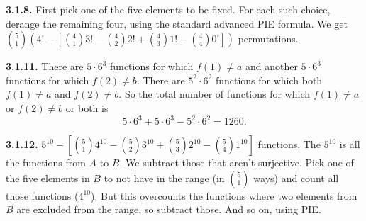 \documentclass[10pt,]{book}
\theoremstyle{plain}
\theoremstyle{definition}
\theoremstyle{definition}
\theoremstyle{definition}
\numberwithin{equation}{chapter}
\begin{document}
\noindent\textbf{3.1.8.} \hypertarget{p-1169}{}%
First pick one of the five elements to be fixed.  For each such choice, derange the remaining four, using the standard advanced PIE formula.  We get \({5 \choose 1}\left( 4! - \left[{4 \choose 1}3! - {4 \choose 2}2! + {4 \choose 3} 1! - {4 \choose 4} 0!\right] \right)\) permutations.%
\par\smallskip
\noindent\textbf{3.1.11.} \hypertarget{p-1176}{}%
There are \(5 \cdot 6^3\) functions for which \(f(1) \ne a\) and another \(5 \cdot 6^3\) functions for which \(f(2) \ne b\).  There are \(5^2 \cdot 6^2\) functions for which both \(f(1) \ne a\) and \(f(2) \ne b\).  So the total number of functions for which \(f(1) \ne a\) or \(f(2) \ne b\) or both is%
\begin{equation*}
5 \cdot 6^3 + 5 \cdot 6^3 - 5^2 \cdot 6^2 = 1260.
\end{equation*}
%
\par\smallskip
\noindent\textbf{3.1.12.} \hypertarget{p-1178}{}%
\(5^{10} - \left[{5 \choose 1}4^{10} - {5 \choose 2}3^{10} + {5 \choose 3}2^{10} - {5 \choose 4}1^{10}\right]\) functions.  The \(5^{10}\) is all the functions from \(A\) to \(B\).  We subtract those that aren't surjective.  Pick one of the five elements in \(B\) to not have in the range (in \({5 \choose 1}\) ways) and count all those functions (\(4^{10}\)).  But this overcounts the functions where two elements from \(B\) are excluded from the range, so subtract those.  And so on, using PIE.%
\par\smallskip
\end{document}
